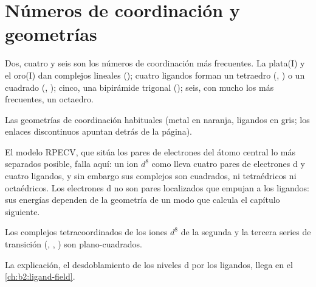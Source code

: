 \section{Números de coordinación y geometrías}

Dos, cuatro y seis son los números de coordinación más frecuentes. La plata(I) y el oro(I) dan
complejos lineales (\ce{[Ag(NH3)2]+}); cuatro ligandos forman un tetraedro
(, ) o un cuadrado (, );
cinco, una bipirámide trigonal (); seis, con mucho los más frecuentes, un
octaedro.

\begin{omfigure}

{\small Las geometrías de coordinación habituales (metal en naranja, ligandos en gris; los enlaces
discontinuos apuntan detrás de la página).}
\end{omfigure}

El modelo RPECV, que sitúa los pares de electrones del átomo central lo más separados posible,
falla aquí: un ion $d^8$ como  lleva cuatro pares de electrones d y cuatro
ligandos, y sin embargo sus complejos son cuadrados, ni tetraédricos ni octaédricos. Los
electrones d no son pares localizados que empujan a los ligandos: sus energías dependen
de la geometría de un modo que calcula el capítulo siguiente.

\begin{proposition}\label{prop:b2:coordination-complexes:square-planar}
Los complejos tetracoordinados de los iones $d^8$ de la segunda y la tercera series de transición
(, , ) son plano-cuadrados.
\end{proposition}

\admitted

La explicación, el desdoblamiento de los niveles d por los ligandos, llega en el
\cref{ch:b2:ligand-field}.

